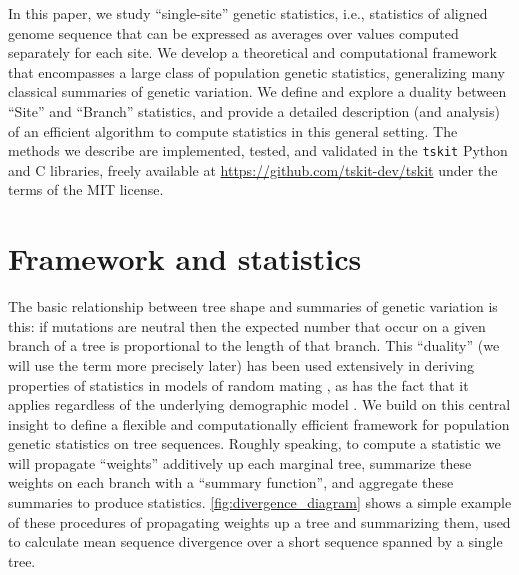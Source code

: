 \documentclass{article}
\newcommand{\tskit}{{\texttt{tskit}}}
\begin{document}
In this paper, we study ``single-site'' genetic statistics,
i.e., statistics of aligned genome sequence that can be expressed as averages over values computed
separately for each site. We develop a theoretical and computational framework
that encompasses a large class of population genetic statistics, generalizing
many classical summaries of genetic variation. We define
and explore a duality between ``Site'' and ``Branch'' statistics, and
provide a detailed description (and analysis) of an efficient algorithm
to compute statistics in this general setting.
The methods we describe are implemented, tested, and validated in the \tskit{}
Python and C libraries, freely available at \url{https://github.com/tskit-dev/tskit}
under the terms of the MIT license.

\section*{Framework and statistics}

The basic relationship between tree shape and summaries of genetic variation
is this: if mutations are neutral then the expected number that occur on a
given branch of a tree is proportional to the length of that branch.
This ``duality'' (we will use the term more precisely later) has been
used extensively in deriving properties of statistics in models of random mating
\citep[e.g.,][]{tajima1983evolutionary,tavare1984lineofdescent,fu1995statistical},
as has the fact that it applies regardless of the underlying demographic model
\citep[e.g.,][]{gillespie1979evolutionary,hudson1983properties,slatkin1991inbreeding,
mcvean2002genealogical,lohse2016efficient,ralph2019empirical}. We build on this central
insight to define a flexible and computationally efficient framework for
population genetic statistics on tree sequences.
Roughly speaking, to compute a statistic we will
propagate ``weights'' additively up each marginal tree,
summarize these weights on each branch with a ``summary function'',
and aggregate these summaries to produce statistics.
\autoref{fig:divergence_diagram} shows a simple example of these procedures
of propagating weights up a tree and summarizing them,
used to calculate mean sequence divergence over a short sequence spanned by a single tree.
\end{document}
